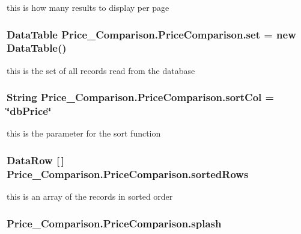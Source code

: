 this is how many results to display per page \hypertarget{class_price___comparison_1_1_price_comparison_a3d6993277a69f5816e84ceb7aa2a69c0}{
\subsubsection[{set}]{\setlength{\rightskip}{0pt plus 5cm}Data\-Table Price\-\_\-\-Comparison.\-Price\-Comparison.\-set = new Data\-Table()\hspace{0.3cm}{\ttfamily [static]}}}\label{class_price___comparison_1_1_price_comparison_a3d6993277a69f5816e84ceb7aa2a69c0}
this is the set of all records read from the database \hypertarget{class_price___comparison_1_1_price_comparison_a8b976f4f4e8b0a3d60f88ac7d799abec}{
\subsubsection[{sort\-Col}]{\setlength{\rightskip}{0pt plus 5cm}String Price\-\_\-\-Comparison.\-Price\-Comparison.\-sort\-Col = \char`\"{}db\-Price\char`\"{}\hspace{0.3cm}{\ttfamily [static]}}}\label{class_price___comparison_1_1_price_comparison_a8b976f4f4e8b0a3d60f88ac7d799abec}
this is the parameter for the sort function \hypertarget{class_price___comparison_1_1_price_comparison_adc440c55ac225fc7bcf5192a3966638f}{
\subsubsection[{sorted\-Rows}]{\setlength{\rightskip}{0pt plus 5cm}Data\-Row \mbox{[}$\,$\mbox{]} Price\-\_\-\-Comparison.\-Price\-Comparison.\-sorted\-Rows\hspace{0.3cm}{\ttfamily [static]}}}\label{class_price___comparison_1_1_price_comparison_adc440c55ac225fc7bcf5192a3966638f}
this is an array of the records in sorted order \hypertarget{class_price___comparison_1_1_price_comparison_a5c27abcda5ec2f037b329583a365e060}{
\subsubsection[{splash}]{ Price\-\_\-\-Comparison.\-Price\-Comparison.\-splash\hspace{0.3cm}{\ttfamily [static]}}}\label{class_price___comparison_1_1_price_comparison_a5c27abcda5ec2f037b329583a365e060}
